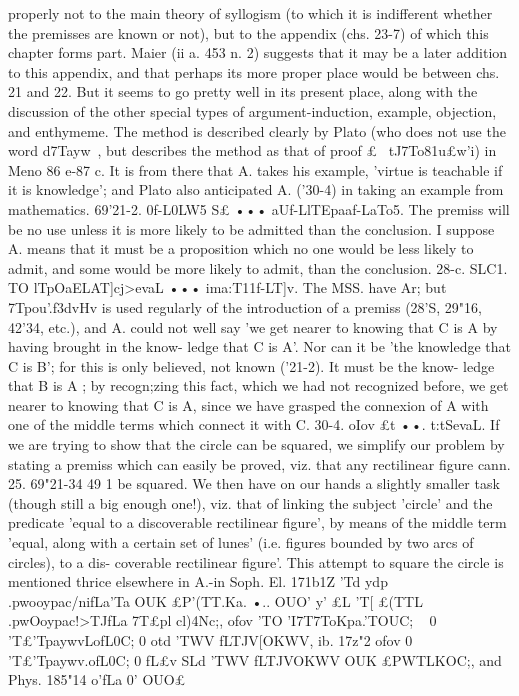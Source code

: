 {{{{{{{{{{{{{{{{{{{{{{{{{{{{properly not to the main theory of syllogism (to which it is
indifferent whether the premisses are known or not), but to the
appendix (chs. 23-7) of which this chapter forms part. Maier
(ii a. 453 n. 2) suggests that it may be a later addition to this
appendix, and that perhaps its more proper place would be
between chs. 21 and 22. But it seems to go pretty well in its
present place, along with the discussion of the other special types
of argument-induction, example, objection, and enthymeme.
The method is described clearly by Plato (who does not use
the word d7Tayw~, but describes the method as that of proof £~
tJ7To81u£w'i) in Meno 86 e-87 c. It is from there that A. takes his
example, 'virtue is teachable if it is knowledge'; and Plato also
anticipated A. ('30-4) in taking an example from mathematics.
69'21-2. 0f-L0LW5 S£ ••• aUf-LlTEpaaf-LaTo5. The premiss will be
no use unless it is more likely to be admitted than the conclusion.
I suppose A. means that it must be a proposition which no one
would be less likely to admit, and some would be more likely to
admit, than the conclusion.
28-c}. SLC1. TO lTpOaELAT]cj>evaL ••• ima:T11f-LT]v. The MSS. have
Ar; but 7Tpou'\op.f3dvHv is used regularly of the introduction of a
premiss (28'S, 29"16, 42'34, etc.), and A. could not well say 'we
get nearer to knowing that C is A by having brought in the know-
ledge that C is A'. Nor can it be 'the knowledge that C is B';
for this is only believed, not known ('21-2). It must be the know-
ledge that B is A ; by recogn;zing this fact, which we had not
recognized before, we get nearer to knowing that C is A, since
we have grasped the connexion of A with one of the middle terms
which connect it with C.
30-4. oIov £t ••. t:tSevaL. If we are trying to show that the
circle can be squared, we simplify our problem by stating a premiss
which can easily be proved, viz. that any rectilinear figure cann.
25. 69"21-34
49 1
be squared. We then have on our hands a slightly smaller task
(though still a big enough one!), viz. that of linking the subject
'circle' and the predicate 'equal to a discoverable rectilinear
figure', by means of the middle term 'equal, along with a certain
set of lunes' (i.e. figures bounded by two arcs of circles), to a dis-
coverable rectilinear figure'.
This attempt to square the circle is mentioned thrice elsewhere
in A.-in Soph. El. 171b1Z 'Td ydp .pwooypac/nifLa'Ta OUK £P'(TT.Ka. •..
OUO' y' £L 'T[ £(TTL .pwOoypac!>TJfLa 7T£pl cl)4Nc;, ofov 'TO 'I7T7ToKpa.'TOUC; ~ 0
'T£'TpaywvLofL0C; 0 otd 'TWV fLTJV[OKWV, ib. 17z"2 ofov 0 'T£'Tpaywv.ofL0C; 0
fL£v SLd 'TWV fLTJV{OKWV OUK £PWTLKOC;, and Phys. 185"14 o'fLa 0' OUO£
}}}}}}}}}}}}}}}}}}}}}}}}}}}}
